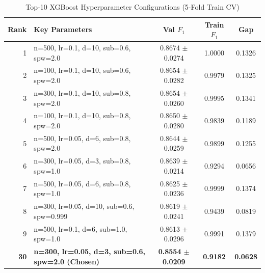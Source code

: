 \begin{table}[!htbp]
\centering
\caption{Top-10 XGBoost Hyperparameter Configurations (5-Fold Train CV)}
\label{tab:xgb_tuning}
\footnotesize
\begin{tabularx}{\linewidth}{r X c c c}
\toprule
\textbf{Rank} & \textbf{Key Parameters} & \textbf{Val $F_1$} & \textbf{Train $F_1$} & \textbf{Gap} \\
\midrule
1 & n=500, lr=0.1, d=10, sub=0.6, spw=2.0 & 0.8674 $\pm$ 0.0274 & 1.0000 & 0.1326 \\
2 & n=100, lr=0.1, d=10, sub=0.6, spw=2.0 & 0.8654 $\pm$ 0.0282 & 0.9979 & 0.1325 \\
3 & n=300, lr=0.1, d=10, sub=0.8, spw=2.0 & 0.8654 $\pm$ 0.0260 & 0.9995 & 0.1341 \\
4 & n=100, lr=0.1, d=10, sub=0.8, spw=2.0 & 0.8650 $\pm$ 0.0280 & 0.9839 & 0.1189 \\
5 & n=500, lr=0.05, d=6, sub=0.8, spw=2.0 & 0.8644 $\pm$ 0.0259 & 0.9899 & 0.1255 \\
6 & n=300, lr=0.05, d=3, sub=0.8, spw=1.0 & 0.8639 $\pm$ 0.0214 & 0.9294 & 0.0656 \\
7 & n=500, lr=0.05, d=6, sub=0.8, spw=1.0 & 0.8625 $\pm$ 0.0236 & 0.9999 & 0.1374 \\
8 & n=300, lr=0.05, d=10, sub=0.6, spw=0.999 & 0.8619 $\pm$ 0.0241 & 0.9439 & 0.0819 \\
9 & n=500, lr=0.1, d=6, sub=1.0, spw=1.0 & 0.8613 $\pm$ 0.0296 & 0.9991 & 0.1379 \\
\textbf{30} & \textbf{n=300, lr=0.05, d=3, sub=0.6, spw=2.0 (Chosen)} & \textbf{0.8554 $\pm$ 0.0209} & \textbf{0.9182} & \textbf{0.0628} \\
\bottomrule
\end{tabularx}
\end{table}